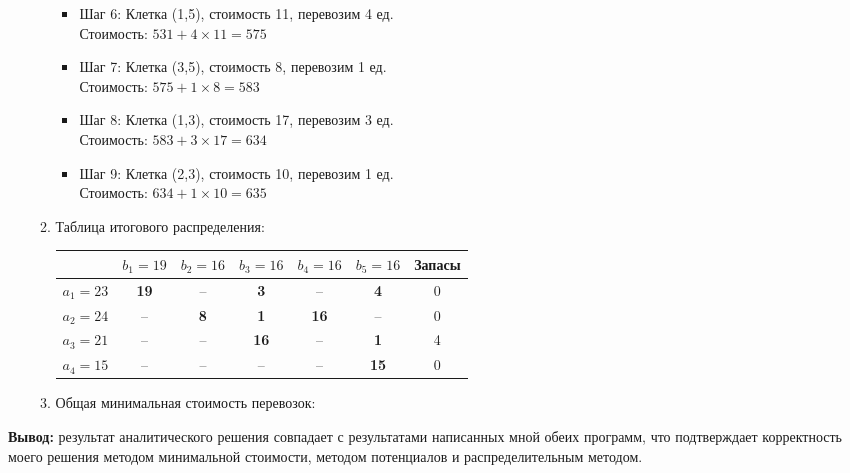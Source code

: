 \documentclass{report}
\begin{document}
\begin{enumerate}
\begin{enumerate}
\begin{itemize}
			\item Шаг 6: Клетка (1,5), стоимость 11, перевозим 4 ед. \\
			Стоимость: $531 + 4 \times 11 = 575$
			
			\item Шаг 7: Клетка (3,5), стоимость 8, перевозим 1 ед. \\
			Стоимость: $575 + 1 \times 8 = 583$
			
			\item Шаг 8: Клетка (1,3), стоимость 17, перевозим 3 ед. \\
			Стоимость: $583 + 3 \times 17 = 634$
			
			\item Шаг 9: Клетка (2,3), стоимость 10, перевозим 1 ед. \\
			Стоимость: $634 + 1 \times 10 = \boxed{635}$
		\end{itemize}
		
		\item Таблица итогового распределения:
		
		\begin{center}
			\begin{tabular}{|c|c|c|c|c|c|c|}
				\hline
				& $b_1=19$ & $b_2=16$ & $b_3=16$ & $b_4=16$ & $b_5=16$ & Запасы \\ \hline
				$a_1=23$ & \textbf{19} & -- & \textbf{3} & -- & \textbf{4} & 0 \\ \hline
				$a_2=24$ & -- & \textbf{8} & \textbf{1} & \textbf{16} & -- & 0 \\ \hline
				$a_3=21$ & -- & -- & \textbf{16} & -- & \textbf{1} & 4 \\ \hline
				$a_4=15$ & -- & -- & -- & -- & \textbf{15} & 0 \\ \hline
			\end{tabular}
		\end{center}
		
		\item Общая минимальная стоимость перевозок: 
	\end{enumerate}
\end{enumerate}
	
	\textbf{Вывод: }результат аналитического решения совпадает с результатами написанных мной обеих программ, что подтверждает корректность моего решения методом минимальной стоимости, методом потенциалов и распределительным методом.
\end{document}

